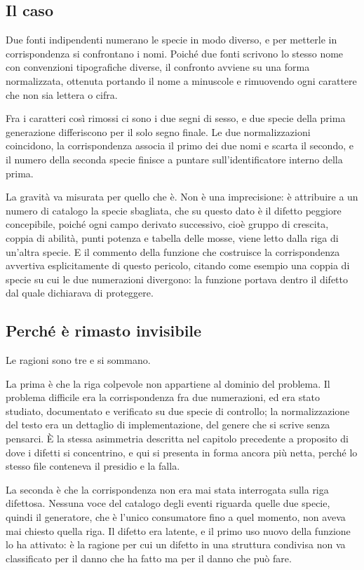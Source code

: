 \subsection*{Il caso}

Due fonti indipendenti numerano le specie in modo diverso, e per metterle in corrispondenza si confrontano i nomi. Poiché due fonti scrivono lo stesso nome con convenzioni tipografiche diverse, il confronto avviene su una forma normalizzata, ottenuta portando il nome a minuscole e rimuovendo ogni carattere che non sia lettera o cifra.

Fra i caratteri così rimossi ci sono i due segni di sesso, e due specie della prima generazione differiscono per il solo segno finale. Le due normalizzazioni coincidono, la corrispondenza associa il primo dei due nomi e scarta il secondo, e il numero della seconda specie finisce a puntare sull'identificatore interno della prima.

La gravità va misurata per quello che è. Non è una imprecisione: è attribuire a un numero di catalogo la specie sbagliata, che su questo dato è il difetto peggiore concepibile, poiché ogni campo derivato successivo, cioè gruppo di crescita, coppia di abilità, punti potenza e tabella delle mosse, viene letto dalla riga di un'altra specie. E il commento della funzione che costruisce la corrispondenza avvertiva esplicitamente di questo pericolo, citando come esempio una coppia di specie su cui le due numerazioni divergono: la funzione portava dentro il difetto dal quale dichiarava di proteggere.

\subsection*{Perché è rimasto invisibile}

Le ragioni sono tre e si sommano.

La prima è che la riga colpevole non appartiene al dominio del problema. Il problema difficile era la corrispondenza fra due numerazioni, ed era stato studiato, documentato e verificato su due specie di controllo; la normalizzazione del testo era un dettaglio di implementazione, del genere che si scrive senza pensarci. È la stessa asimmetria descritta nel capitolo precedente a proposito di dove i difetti si concentrino, e qui si presenta in forma ancora più netta, perché lo stesso file conteneva il presidio e la falla.

La seconda è che la corrispondenza non era mai stata interrogata sulla riga difettosa. Nessuna voce del catalogo degli eventi riguarda quelle due specie, quindi il generatore, che è l'unico consumatore fino a quel momento, non aveva mai chiesto quella riga. Il difetto era latente, e il primo uso nuovo della funzione lo ha attivato: è la ragione per cui un difetto in una struttura condivisa non va classificato per il danno che ha fatto ma per il danno che può fare.


